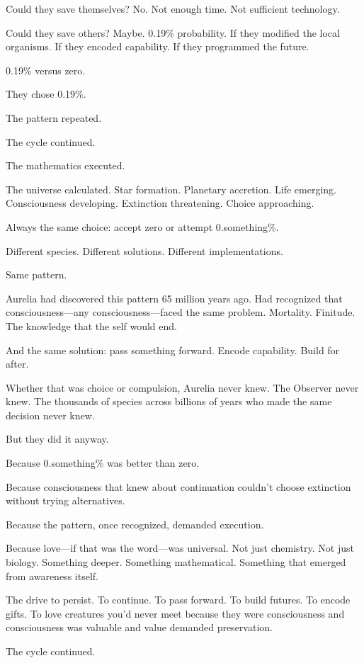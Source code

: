 Could they save themselves? No. Not enough time. Not sufficient technology.

Could they save others? Maybe. 0.19\% probability. If they modified the local organisms. If they encoded capability. If they programmed the future.

0.19\% versus zero.

They chose 0.19\%.

The pattern repeated.

The cycle continued.

The mathematics executed.

\scenebreak

The universe calculated. Star formation. Planetary accretion. Life emerging. Consciousness developing. Extinction threatening. Choice approaching.

Always the same choice: accept zero or attempt 0.something\%.

Different species. Different solutions. Different implementations.

Same pattern.

Aurelia had discovered this pattern 65 million years ago. Had recognized that consciousness—any consciousness—faced the same problem. Mortality. Finitude. The knowledge that the self would end.

And the same solution: pass something forward. Encode capability. Build for after.

Whether that was choice or compulsion, Aurelia never knew. The Observer never knew. The thousands of species across billions of years who made the same decision never knew.

But they did it anyway.

Because 0.something\% was better than zero.

Because consciousness that knew about continuation couldn't choose extinction without trying alternatives.

Because the pattern, once recognized, demanded execution.

Because love—if that was the word—was universal. Not just chemistry. Not just biology. Something deeper. Something mathematical. Something that emerged from awareness itself.

The drive to persist. To continue. To pass forward. To build futures. To encode gifts. To love creatures you'd never meet because they were consciousness and consciousness was valuable and value demanded preservation.

The cycle continued.

